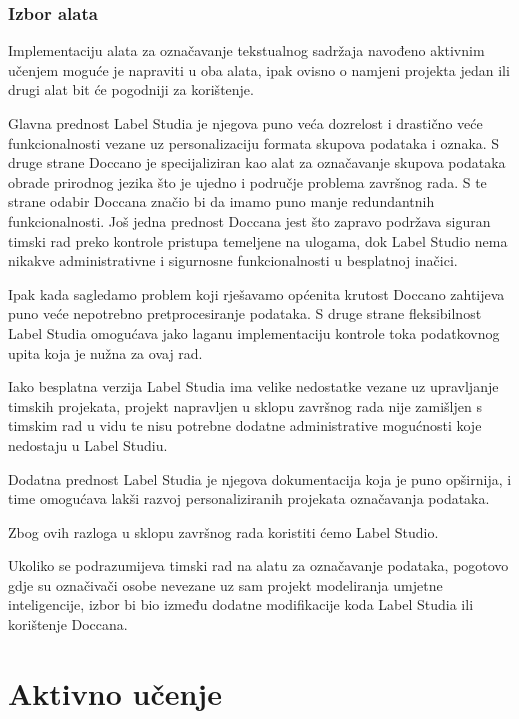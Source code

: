 \documentclass[times, utf8, zavrsni, numeric]{fer}
\begin{document}
\subsection{Izbor alata}
\label{subs:izbor_alata}

Implementaciju alata za označavanje tekstualnog sadržaja navođeno aktivnim učenjem moguće je napraviti u oba alata, ipak ovisno o namjeni projekta jedan ili drugi alat bit će pogodniji za korištenje. 

Glavna prednost Label Studia je njegova puno veća dozrelost i drastično veće funkcionalnosti vezane uz personalizaciju formata skupova podataka i oznaka. S druge strane Doccano je specijaliziran kao alat za označavanje skupova podataka obrade prirodnog jezika što je ujedno i područje problema završnog rada. S te strane odabir Doccana značio bi da imamo puno manje redundantnih funkcionalnosti. Još jedna prednost Doccana jest što zapravo podržava siguran timski rad preko kontrole pristupa temeljene na ulogama, dok Label Studio nema nikakve administrativne i sigurnosne funkcionalnosti u besplatnoj inačici.

Ipak kada sagledamo problem koji rješavamo općenita krutost Doccano zahtijeva puno veće nepotrebno pretprocesiranje podataka. S druge strane fleksibilnost Label Studia omogućava jako laganu implementaciju kontrole toka podatkovnog upita koja je nužna za ovaj rad.

Iako besplatna verzija Label Studia ima velike nedostatke vezane uz upravljanje timskih projekata, projekt napravljen u sklopu završnog rada nije zamišljen s timskim rad u vidu te nisu potrebne dodatne administrative mogućnosti koje nedostaju u Label Studiu.

Dodatna prednost Label Studia je njegova dokumentacija koja je puno opširnija, i time omogućava lakši razvoj personaliziranih projekata označavanja podataka. 

Zbog ovih razloga u sklopu završnog rada koristiti ćemo Label Studio.

Ukoliko se podrazumijeva timski rad na alatu za označavanje podataka, pogotovo gdje su označivači osobe nevezane uz sam projekt modeliranja umjetne inteligencije, izbor bi bio između dodatne modifikacije koda Label Studia ili korištenje Doccana.

\chapter{Aktivno učenje}
\label{chap:aktivno_ucenje}
\end{document}
